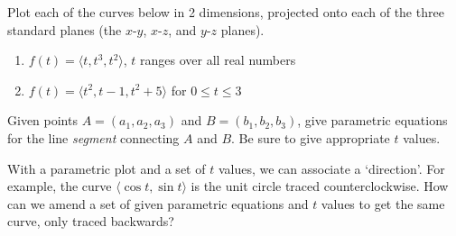 \begin{enumialphparenastyle}
\begin{ex}
Plot each of the curves below in 2 dimensions, projected
onto each of the three standard planes (the $x$-$y$, $x$-$z$, and
$y$-$z$ planes).
\begin{enumerate}
	\item	$f(t)=\langle t, t^3, t^2 \rangle$, $t$ ranges over all real numbers
	\item	$f(t)=\langle t^2, t-1, t^2+5 \rangle$  for $0\leq t \leq 3$
\end{enumerate}
\end{ex}

\begin{ex}
Given points $A=(a_1, a_2, a_3)$ and $B=(b_1, b_2, b_3)$, give
parametric equations for the line {\em segment} connecting $A$ and
$B$. Be sure to give appropriate $t$ values.
\end{ex}

\begin{ex}
With a parametric plot and a set of $t$ values, we can associate
a `direction'.  For example, the curve $\langle \cos t, \sin t
\rangle$ is the unit circle traced counterclockwise.  How can we amend
a set of given parametric equations and $t$ values to get the same
curve, only traced backwards?
\end{ex}

\end{enumialphparenastyle}